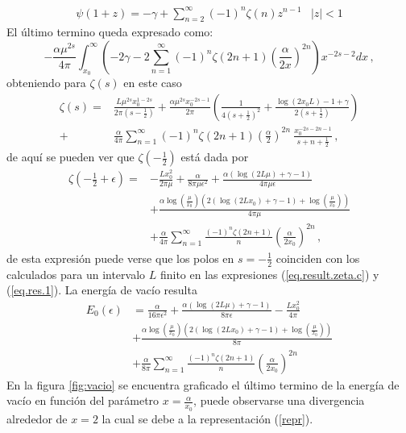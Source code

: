 \begin{equation}
\begin{array}{cc}
\psi (1+ z ) = - \gamma + \sum \limits_{n=2}^{\infty} (-1) ^n \zeta (n) z ^{n-1} & |z| < 1
\end{array}
\label{repr}
\end{equation}
El último termino queda expresado como:
\begin{equation}
- \frac{\alpha \mu ^{2s}}{4 \pi}
\int _{x_0} ^{\infty}
\left(
-2 \gamma -
2 \sum _{n=1} ^{\infty} 
(-1) ^{n}
\zeta (2n+1) 
\left( \frac{\alpha}{2 x} \right) ^{2n}
\right)
x ^{-2s-2} dx
\, ,
\end{equation}
obteniendo para $\zeta  (s) $ en este caso
\begin{align}
	\zeta (s)=
&
\nonumber
	\frac{L  \mu ^{2s} x _0 ^{1-2s} }{2 \pi \left( s- \frac{1}{2} \right)}  + 
	\frac{\alpha \mu ^{2s} x _{0} ^{-2s-1} }{2 \pi} 
	\left( 
	\frac{1}{4 \left(s+ \frac{1}{2} \right) ^2} +
	\frac{\log(2 x _0 L) -1 + \gamma}{2 \left(s+\frac{1}{2} \right)} 
	\right) 
\\
+
&	
	\frac{\alpha }{4\pi} 
	\sum _{n=1} ^{\infty} (-1) ^{n} \zeta (2n+1) 
	\left( \frac{\alpha}{2 } \right) ^{2n} \ \frac{x _0 ^{-2s-2n-1}}{s+n+ \frac{1}{2}}
	\, ,
\end{align}
de aquí se pueden ver que $\zeta \left( - \frac{1}{2} \right)$ está dada por
\begin{align}
	\zeta \left(- \frac{1}{2} + \epsilon \right)=
&
\nonumber
	-
	\frac{L x _0 ^2}{2 \pi \mu}+ 
	\frac{\alpha}{8 \pi \mu  \epsilon  ^2} +
	\frac{\alpha \left( \log (2 L \mu ) + \gamma -1  \right)}{4 \pi \mu  \epsilon }
\\
\nonumber
&
+
	\frac{\alpha \log \left( \frac{\mu}{x _0} \right) 	
		\left( 2 (\log ( 2 L x_0) + \gamma -1 ) + \log \left( \frac{\mu}{x _0}\right)  \right) }{4 \pi \mu}
\\
&
+	
	\frac{\alpha }{4\pi} 
	\sum _{n=1} ^{\infty} \frac{(-1) ^{n} \zeta (2n+1) }{n}  
	\left( \frac{\alpha}{2 x _0} \right) ^{2n}
\, ,
\end{align}
de esta expresión puede verse que los polos en $s = -\frac{1}{2}$ coinciden con los calculados para un intervalo $L$ finito en las expresiones (\ref{eq.result.zeta.c}) y (\ref{eq.res.1}).
La energía de vacío resulta
\begin{align}
\label{eq.energia.cotinua}
	E _0 ( \epsilon ) 
&	
	=
\nonumber
	\frac{\alpha}{16 \pi  \epsilon  ^2} +
	\frac{\alpha \left( \log (2 L \mu ) + \gamma -1  \right)}{8 \pi \epsilon } -
	\frac{L x _0 ^2}{4 \pi}
\\
\nonumber
&
+
	\frac{\alpha \log \left( \frac{\mu}{x _0} \right) 	
		\left( 2 (\log ( 2 L x_0) + \gamma -1 ) + \log \left( \frac{\mu}{x _0}\right)  \right) }{8 \pi}
\\
&
+	
	\frac{\alpha }{8 \pi} 
	\sum _{n=1} ^{\infty} \frac{(-1) ^{n} \zeta (2n+1) }{n}  
	\left( \frac{\alpha}{2 x _0} \right) ^{2n}
\end{align}
En la figura \ref{fig:vacio} se encuentra graficado el último termino de la energía de vacío en función del parámetro $x = \frac{\alpha}{x_0}$, puede observarse una divergencia alrededor de $x=2$ la cual se debe a la representación (\ref{repr}).

